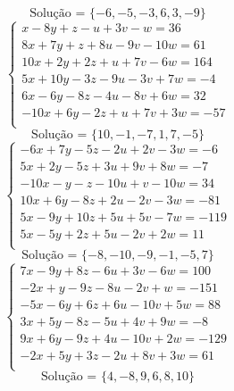 \documentclass[12pt,oneside,a4paper]{article}
\begin{document}
\begin{equation*}
\text{Solução = }\{-6,-5,-3,6,3,-9\}
\end{equation*}
\vspace{\baselineskip}
\begin{equation*}
\begin{cases}
x-8y+z-u+3v-w=36 \\
8x+7y+z+8u-9v-10w=61 \\
10x+2y+2z+u+7v-6w=164 \\
5x+10y-3z-9u-3v+7w=-4 \\
6x-6y-8z-4u-8v+6w=32 \\
-10x+6y-2z+u+7v+3w=-57 \\
\end{cases}
\end{equation*}
\begin{equation*}
\text{Solução = }\{10,-1,-7,1,7,-5\}
\end{equation*}
\vspace{\baselineskip}
\begin{equation*}
\begin{cases}
-6x+7y-5z-2u+2v-3w=-6 \\
5x+2y-5z+3u+9v+8w=-7 \\
-10x-y-z-10u+v-10w=34 \\
10x+6y-8z+2u-2v-3w=-81 \\
5x-9y+10z+5u+5v-7w=-119 \\
5x-5y+2z+5u-2v+2w=11 \\
\end{cases}
\end{equation*}
\begin{equation*}
\text{Solução = }\{-8,-10,-9,-1,-5,7\}
\end{equation*}
\vspace{\baselineskip}
\begin{equation*}
\begin{cases}
7x-9y+8z-6u+3v-6w=100 \\
-2x+y-9z-8u-2v+w=-151 \\
-5x-6y+6z+6u-10v+5w=88 \\
3x+5y-8z-5u+4v+9w=-8 \\
9x+6y-9z+4u-10v+2w=-129 \\
-2x+5y+3z-2u+8v+3w=61 \\
\end{cases}
\end{equation*}
\begin{equation*}
\text{Solução = }\{4,-8,9,6,8,10\}
\end{equation*}
\end{document}
